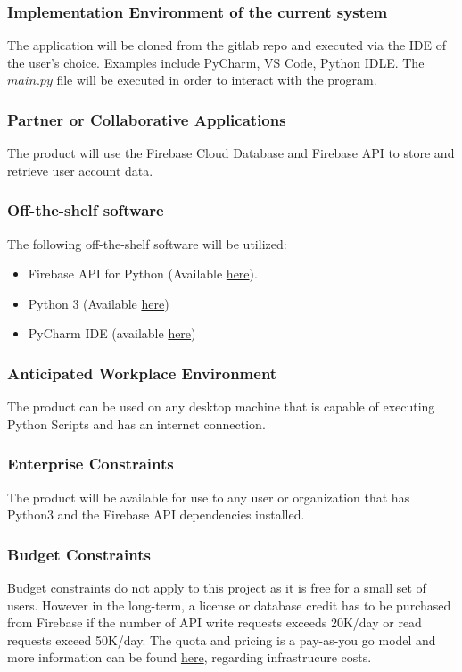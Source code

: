 \documentclass[12pt, titlepage]{article}
\begin{document}
\subsubsection{Implementation Environment of the current system}
The application will be cloned from the gitlab repo and executed via the IDE of the user's choice. Examples include PyCharm, VS Code, Python IDLE. The $main.py$ file will be executed in order to interact with the program.

\subsubsection{Partner or Collaborative Applications}
The product will use the Firebase Cloud Database and Firebase API to store and retrieve user account data.

\subsubsection{Off-the-shelf software}
The following off-the-shelf software will be utilized:
\begin{itemize}
    \item Firebase API for Python (Available \href{https://github.com/thisbejim/Pyrebase)}{here}).
    \item Python 3 (Available \href{https://www.python.org/downloads/)}{here})
    \item PyCharm IDE (available \href{https://www.jetbrains.com/pycharm/download/#section=windows)}{here}) 
\end{itemize}

\subsubsection{Anticipated Workplace Environment}
The product can be used on any desktop machine that is capable of executing Python Scripts and has an internet connection.

\subsubsection{Enterprise Constraints}
The product will be available for use to any user or organization that has Python3 and the Firebase API dependencies installed.

\subsubsection{Budget Constraints}
Budget constraints do not apply to this project as it is free for a small set of users. However in the long-term, a license or database credit has to be purchased from Firebase if the number of API write requests exceeds 20K/day or read requests exceed 50K/day. The quota and pricing is a pay-as-you go model and more information can be found \href{https://firebase.google.com/pricing)}{here}, regarding infrastrucure costs.
\end{document}
